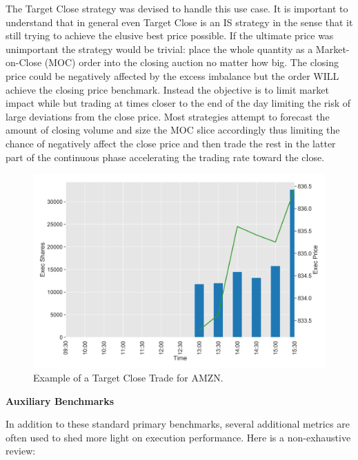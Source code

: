 The Target Close strategy was devised to handle this use case. It is important to understand that in general even Target Close is an IS strategy in the sense that it still trying to achieve the elusive best price possible. If the ultimate price was unimportant the strategy would be trivial: place the whole quantity as a Market-on-Close (MOC) order into the closing auction no matter how big. The closing price could be negatively affected by the excess imbalance but the order WILL achieve the closing price benchmark. Instead the objective is to limit market impact while but trading at times closer to the end of the day limiting the risk of large deviations from the close price. Most strategies attempt to forecast the amount of closing volume and size the MOC slice accordingly thus limiting the chance of negatively affect the close price and then trade the rest in the latter part of the continuous phase accelerating the trading rate toward the close. \twomedskip

	\begin{figure}[!ht]
	\centering
	\includegraphics[width=\textwidth]{chapters/chapter_exec_models/figures/close.png} 
	\caption{Example of a Target Close Trade for AMZN. \label{fig:close}}
	\end{figure}


\noindent\textbf{Auxiliary Benchmarks} \twomedskip


In addition to these standard primary benchmarks, several additional metrics are often used to shed more light on execution performance. Here is a non-exhaustive review:


